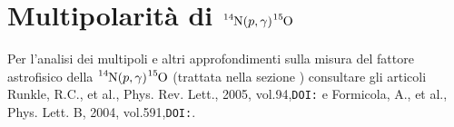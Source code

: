 \section{Multipolarità di $\ce{^{14}N}(p,\gamma)\ce{^{15}O}$}\label{compl-multipoli}
Per l'analisi dei multipoli e altri approfondimenti sulla misura del fattore astrofisico della $\ce{^{14}N}(p,\gamma)\ce{^{15}O}$ (trattata nella sezione ) consultare gli articoli Runkle, R.C., et al., Phys. Rev. Lett., 2005, vol.94,\texttt{DOI:} e Formicola, A., et al., Phys. Lett. B, 2004, vol.591,\texttt{DOI:}.
